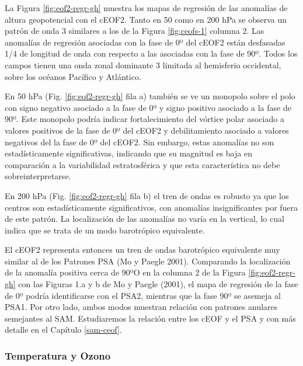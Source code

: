 \documentclass[12pt,oneside,a4paper]{reedthesis}
\begin{document}
La Figura \ref{fig:eof2-regr-gh} muestra los mapas de regresión de las anomalías de altura geopotencial con el cEOF2.
Tanto en 50 como en 200 hPa se observa un patrón de onda 3 similares a los de la Figura \ref{fig:ceofs-1} columna 2.
Las anomalías de regresión asociadas con la fase de 0º del cEOF2 están desfasadas 1/4 de longitud de onda con respecto a las asociadas con la fase de 90º.
Todos los campos tienen una onda zonal dominante 3 limitada al hemisferio occidental, sobre los océanos Pacífico y Atlántico.

En 50 hPa (Fig. \ref{fig:eof2-regr-gh} fila a) también se ve un monopolo sobre el polo con signo negativo asociado a la fase de 0º y signo positivo asociado a la fase de 90º.
Este monopolo podría indicar fortalecimiento del vórtice polar asociado a valores positivos de la fase de 0º del cEOF2 y debilitamiento asociado a valores negativos del la fase de 0º del cEOF2.
Sin embargo, estas anomalías no son estadísticamente significativas, indicando que su magnitud es baja en comparación a la variabilidad estratosférica y que esta característica no debe sobreinterpretarse.

En 200 hPa (Fig. \ref{fig:eof2-regr-gh} fila b) el tren de ondas es robusto ya que los centros son estadísticamente significativos, con anomalías insignificantes por fuera de este patrón.
La localización de las anomalías no varía en la vertical, lo cual indica que se trata de un modo barotrópico equivalente.

El cEOF2 representa entonces un tren de ondas barotrópico equivalente muy similar al de los Patrones PSA (Mo y Paegle 2001).
Comparando la localización de la anomalía positiva cerca de 90ºO en la columna 2 de la Figura \ref{fig:eof2-regr-gh} con las Figuras 1.a y b de Mo y Paegle (2001), el mapa de regresión de la fase de 0º podría identificarse con el PSA2, mientras que la fase 90º se asemeja al PSA1.
Por otro lado, ambos modos muestran relación con patrones anulares semejantes al SAM.
Estudiaremos la relación entre los cEOF y el PSA y con más detalle en el Capítulo \ref{sam-ceof}.

\hypertarget{temperatura-y-ozono}{%
\subsubsection{Temperatura y Ozono}\label{temperatura-y-ozono}}
\end{document}
